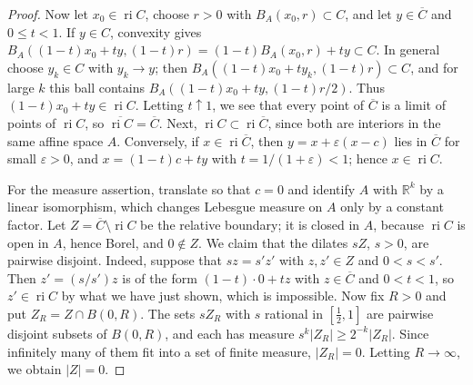 \begin{proof}
Now let $x_0\in\operatorname{ri}C$, choose $r>0$ with $B_A(x_0,r)\subset C$, and let $y\in\overline C$ and $0\leq t<1$. If $y\in C$, convexity gives $B_A((1-t)x_0+ty,(1-t)r)=(1-t)B_A(x_0,r)+ty\subset C$. In general choose $y_k\in C$ with $y_k\to y$; then $B_A((1-t)x_0+ty_k,(1-t)r)\subset C$, and for large $k$ this ball contains $B_A((1-t)x_0+ty,(1-t)r/2)$. Thus $(1-t)x_0+ty\in\operatorname{ri}C$. Letting $t\uparrow1$, we see that every point of $\overline C$ is a limit of points of $\operatorname{ri}C$, so $\overline{\operatorname{ri}C}=\overline C$. Next, $\operatorname{ri}C\subset\operatorname{ri}\overline C$, since both are interiors in the same affine space $A$. Conversely, if $x\in\operatorname{ri}\overline C$, then $y=x+\varepsilon(x-c)$ lies in $\overline C$ for small $\varepsilon>0$, and $x=(1-t)c+ty$ with $t=1/(1+\varepsilon)<1$; hence $x\in\operatorname{ri}C$.

For the measure assertion, translate so that $c=0$ and identify $A$ with $\mathbb R^k$ by a linear isomorphism, which changes Lebesgue measure on $A$ only by a constant factor. Let $Z=\overline C\setminus\operatorname{ri}C$ be the relative boundary; it is closed in $A$, because $\operatorname{ri}C$ is open in $A$, hence Borel, and $0\notin Z$. We claim that the dilates $sZ$, $s>0$, are pairwise disjoint. Indeed, suppose that $sz=s'z'$ with $z,z'\in Z$ and $0<s<s'$. Then $z'=(s/s')z$ is of the form $(1-t)\cdot0+tz$ with $z\in\overline C$ and $0<t<1$, so $z'\in\operatorname{ri}C$ by what we have just shown, which is impossible. Now fix $R>0$ and put $Z_R=Z\cap B(0,R)$. The sets $sZ_R$ with $s$ rational in $[\frac12,1]$ are pairwise disjoint subsets of $B(0,R)$, and each has measure $s^k|Z_R|\geq2^{-k}|Z_R|$. Since infinitely many of them fit into a set of finite measure, $|Z_R|=0$. Letting $R\to\infty$, we obtain $|Z|=0$.
\end{proof}

